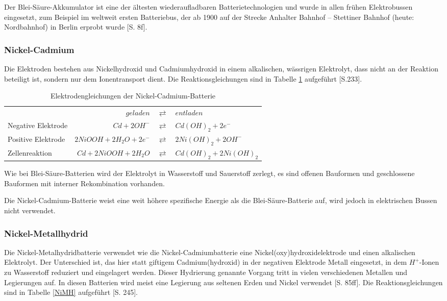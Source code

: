 Der Blei-Säure-Akkumulator ist eine der ältesten wiederaufladbaren Batterietechnologien und wurde in allen frühen Elektrobussen eingesetzt, zum Beispiel im weltweit ersten Batteriebus, der ab 1900 auf der Strecke Anhalter Bahnhof – Stettiner Bahnhof (heute: Nordbahnhof) in Berlin erprobt wurde \cite{Risch:1957}[S. 8f].

\subsubsection{Nickel-Cadmium}
Die Elektroden bestehen aus Nickelhydroxid und Cadmiumhydroxid in einem alkalischen, wässrigen Elektrolyt, dass nicht an der Reaktion beteiligt ist, sondern nur dem Ionentransport dient. Die Reaktionsgleichungen sind in Tabelle \ref{NiCd} aufgeführt \cite{Sterner:2014}[S.233].

\begin{table}\centering
	\begin{tabularx}{\linewidth}{XrcX}
		&               $geladen$ & $\rightleftarrows$ & $entladen$             \\
		Negative Elektrode &            $Cd + 2OH^-$ & $\rightleftarrows$ & $Cd(OH)_2 + 2e^-$      \\
		Positive Elektrode & $2NiOOH + 2H_2O + 2e^-$ & $\rightleftarrows$ & $2Ni(OH)_2 + 2OH^-$    \\ \midrule
		Zellenreaktion     &   $Cd + 2NiOOH + 2H_2O$ & $\rightleftarrows$ & $Cd(OH)_2 + 2Ni(OH)_2$ \\
	\end{tabularx}
	\caption{Elektrodengleichungen der Nickel-Cadmium-Batterie}
	\label{NiCd}
\end{table}

Wie bei Blei-Säure-Batterien wird der Elektrolyt in Wasserstoff und Sauerstoff zerlegt, es sind offenen Bauformen und geschlossene Bauformen mit interner Rekombination vorhanden.

Die Nickel-Cadmium-Batterie weist eine weit höhere spezifische Energie als die Blei-Säure-Batterie auf, wird jedoch in elektrischen Bussen nicht verwendet. 

\subsubsection{Nickel-Metallhydrid}
Die Nickel-Metalhydridbatterie verwendet wie die Nickel-Cadmiumbatterie eine Nickel(oxy)hydroxidelektrode und einen alkalischen Elektrolyt. Der Unterschied ist, das hier statt giftigem Cadmium(hydroxid) in der negativen Elektrode Metall eingesetzt, in dem $H^+$-Ionen zu Wasserstoff reduziert und eingelagert werden. Dieser Hydrierung genannte Vorgang tritt in vielen verschiedenen Metallen und Legierungen auf. In diesen Batterien wird meist eine Legierung aus seltenen Erden und Nickel verwendet \cite{KiehneBattery}[S. 85ff]. Die Reaktionsgleichungen sind in Tabelle \ref{NiMH} aufgeführt \cite{Sterner:2014}[S. 245].

